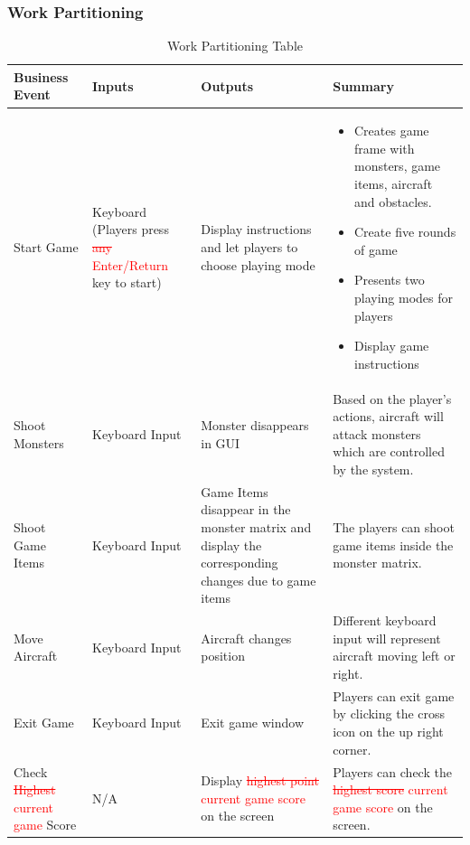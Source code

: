 \documentclass[12pt]{article}
\begin{document}
\subsubsection{Work Partitioning}
\begin{table}[h!]
\centering
\begin{tabular}{| p{3.5cm} | p{3cm} | p{3cm}| p{8cm}|}
\hline
\textbf{Business Event} & \textbf{Inputs} & \textbf{Outputs}&\textbf{Summary}\\
\hline
Start Game& Keyboard (Players press \textcolor{red}{\st{any} Enter/Return} key to start) & Display instructions and let players to choose playing mode & 
\begin{itemize}
\item Creates game frame with monsters, game items, aircraft and obstacles.
\item Create five rounds of game
\item Presents two playing modes for players
\item Display game instructions
\end{itemize}
\\
\hline
Shoot Monsters & Keyboard Input & Monster disappears in GUI & Based on the player's actions, aircraft will attack 
monsters which are controlled by the system.\\
\hline
Shoot Game Items & Keyboard Input & Game Items disappear in the monster matrix and display the corresponding changes due to game items & The players can shoot game items inside the
monster matrix.\\
\hline
Move Aircraft & Keyboard Input & Aircraft changes position & 
Different keyboard input will represent aircraft moving left
or right.\\
\hline
Exit Game & Keyboard Input & Exit game window & Players can
exit game by clicking the cross icon on the up right
corner.\\
\hline
Check \textcolor{red}{\st{Highest} current game} Score & N/A & 
Display \textcolor{red}{\st{highest point} current game score} on the screen & Players can 
check the \textcolor{red}{\st{highest score} current game score} on the screen.\\
\hline
\end{tabular}
\caption{Work Partitioning Table}
\end{table}
\newpage
\end{document}
